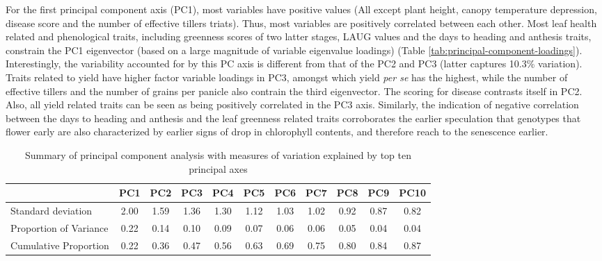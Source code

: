 \documentclass[12pt,oneside]{dukestatscithesis} %
\theoremstyle{definition}
\theoremstyle{definition}
\theoremstyle{definition}
\theoremstyle{remark}
\begin{document}
For the first principal component axis (PC1), most variables have
positive values (All except plant height, canopy temperature depression,
disease score and the number of effective tillers triats). Thus, most
variables are positively correlated between each other. Most leaf health
related and phenological traits, including greenness scores of two
latter stages, LAUG values and the days to heading and anthesis traits,
constrain the PC1 eigenvector (based on a large magnitude of variable
eigenvalue loadings) (Table \ref{tab:principal-component-loadings}).
Interestingly, the variability accounted for by this PC axis is
different from that of the PC2 and PC3 (latter captures 10.3\%
variation). Traits related to yield have higher factor variable loadings
in PC3, amongst which yield \emph{per se} has the highest, while the
number of effective tillers and the number of grains per panicle also
contrain the third eigenvector. The scoring for disease contrasts itself
in PC2. Also, all yield related traits can be seen as being positively
correlated in the PC3 axis. Similarly, the indication of negative
correlation between the days to heading and anthesis and the leaf
greenness related traits corroborates the earlier speculation that
genotypes that flower early are also characterized by earlier signs of
drop in chlorophyll contents, and therefore reach to the senescence
earlier.
\begin{table}[H]

\caption{\label{tab:principal-component-summary}Summary of principal component analysis with measures of variation explained by top ten principal axes}
\centering
\fontsize{11}{13}\selectfont
\begin{tabular}[t]{lcccccccccc}
\toprule
\textbf{ } & \textbf{PC1} & \textbf{PC2} & \textbf{PC3} & \textbf{PC4} & \textbf{PC5} & \textbf{PC6} & \textbf{PC7} & \textbf{PC8} & \textbf{PC9} & \textbf{PC10}\\
\midrule
Standard deviation & 2.00 & 1.59 & 1.36 & 1.30 & 1.12 & 1.03 & 1.02 & 0.92 & 0.87 & 0.82\\
Proportion of Variance & 0.22 & 0.14 & 0.10 & 0.09 & 0.07 & 0.06 & 0.06 & 0.05 & 0.04 & 0.04\\
Cumulative Proportion & 0.22 & 0.36 & 0.47 & 0.56 & 0.63 & 0.69 & 0.75 & 0.80 & 0.84 & 0.87\\
\bottomrule
\end{tabular}
\end{table}
\end{document}
